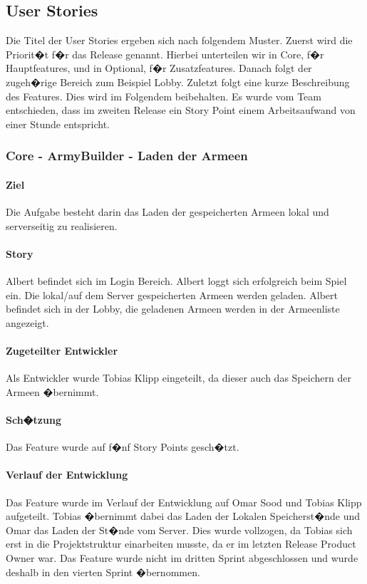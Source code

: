\documentclass[12pt, titlepage]{scrartcl}
\begin{document}
		\subsection{User Stories}
		\label{UserStoriesSprint3}
		Die Titel der User Stories ergeben sich nach folgendem Muster. Zuerst wird die Priorit�t f�r das Release genannt. Hierbei unterteilen wir in \glqq Core\grqq, f�r Hauptfeatures, und in \glqq Optional\grqq, f�r Zusatzfeatures. Danach folgt der zugeh�rige Bereich zum Beispiel \glqq Lobby\grqq. Zuletzt folgt eine kurze Beschreibung des Features. Dies wird im Folgendem beibehalten. Es wurde vom Team entschieden, dass im zweiten Release ein Story Point einem Arbeitsaufwand von einer Stunde entspricht.
		
		\subsubsection{Core - ArmyBuilder - Laden der Armeen}
		\paragraph{Ziel} Die Aufgabe besteht darin das Laden der gespeicherten Armeen lokal und serverseitig zu realisieren.
		\paragraph{Story} Albert befindet sich im Login Bereich. Albert loggt sich erfolgreich beim Spiel ein. Die lokal/auf dem Server gespeicherten Armeen werden geladen. Albert befindet sich in der Lobby, die geladenen Armeen werden in der Armeenliste angezeigt.
		\paragraph{Zugeteilter Entwickler} Als Entwickler wurde Tobias Klipp eingeteilt, da dieser auch das Speichern der Armeen �bernimmt.
		\paragraph{Sch�tzung}
		Das Feature wurde auf f�nf Story Points gesch�tzt.
		\paragraph{Verlauf der Entwicklung} Das Feature wurde im Verlauf der Entwicklung auf Omar Sood und Tobias Klipp aufgeteilt. Tobias �bernimmt dabei das Laden der Lokalen Speicherst�nde und Omar das Laden der St�nde vom Server. Dies wurde vollzogen, da Tobias sich erst in die Projektstruktur einarbeiten musste, da er im letzten Release Product Owner war. Das Feature wurde nicht im dritten Sprint abgeschlossen und wurde deshalb in den vierten Sprint �bernommen.
		
\end{document}
